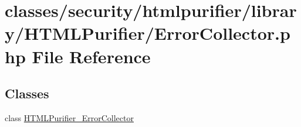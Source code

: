 \hypertarget{ErrorCollector_8php}{\section{classes/security/htmlpurifier/library/\+H\+T\+M\+L\+Purifier/\+Error\+Collector.php File Reference}
\label{ErrorCollector_8php}
}
\subsection*{Classes}
\begin{DoxyCompactItemize}
\item 
class \hyperlink{classHTMLPurifier__ErrorCollector}{H\+T\+M\+L\+Purifier\+\_\+\+Error\+Collector}
\end{DoxyCompactItemize}
